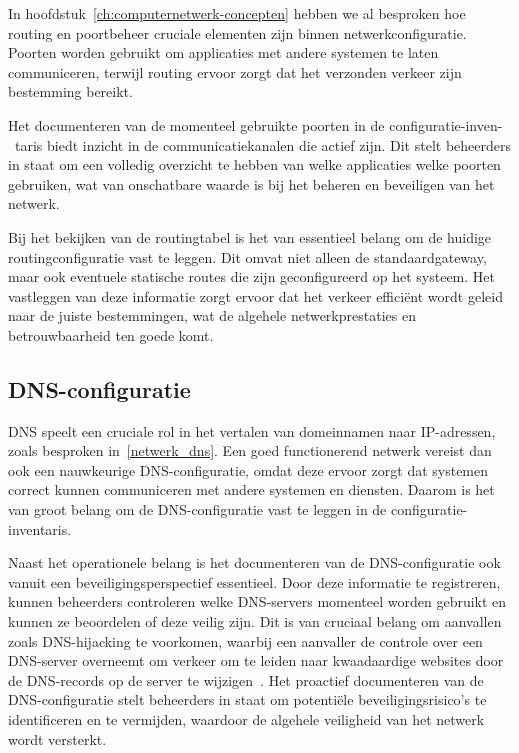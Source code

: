 In hoofdstuk~\ref{ch:computernetwerk-concepten} hebben we al besproken hoe routing en poortbeheer cruciale elementen zijn binnen netwerkconfiguratie.
Poorten worden gebruikt om applicaties met andere systemen te laten communiceren, terwijl routing ervoor zorgt dat het verzonden verkeer zijn bestemming bereikt.

Het documenteren van de momenteel gebruikte poorten in de configuratie-inven-\ taris biedt inzicht in de communicatiekanalen die actief zijn.
Dit stelt beheerders in staat om een volledig overzicht te hebben van welke applicaties welke poorten gebruiken, wat van onschatbare waarde is bij het beheren en beveiligen van het netwerk.

Bij het bekijken van de routingtabel is het van essentieel belang om de huidige routingconfiguratie vast te leggen.
Dit omvat niet alleen de standaardgateway, maar ook eventuele statische routes die zijn geconfigureerd op het systeem.
Het vastleggen van deze informatie zorgt ervoor dat het verkeer effici\"ent wordt geleid naar de juiste bestemmingen, wat de algehele netwerkprestaties en betrouwbaarheid ten goede komt.

\subsection{DNS-configuratie}
\label{risico_dns}

DNS speelt een cruciale rol in het vertalen van domeinnamen naar IP-adressen, zoals besproken in~\ref{netwerk_dns}.
Een goed functionerend netwerk vereist dan ook een nauwkeurige DNS-configuratie, omdat deze ervoor zorgt dat systemen correct kunnen communiceren met andere systemen en diensten.
Daarom is het van groot belang om de DNS-configuratie vast te leggen in de configuratie-inventaris.

Naast het operationele belang is het documenteren van de DNS-configuratie ook vanuit een beveiligingsperspectief essentieel.
Door deze informatie te registreren, kunnen beheerders controleren welke DNS-servers momenteel worden gebruikt en kunnen ze beoordelen of deze veilig zijn.
Dit is van cruciaal belang om aanvallen zoals DNS-hijacking te voorkomen, waarbij een aanvaller de controle over een DNS-server overneemt om verkeer om te leiden naar kwaadaardige websites door de DNS-records op de server te wijzigen~\autocite{shaikh2020overcoming}.
Het proactief documenteren van de DNS-configuratie stelt beheerders in staat om potenti\"ele beveiligingsrisico's te identificeren en te vermijden, waardoor de algehele veiligheid van het netwerk wordt versterkt.

